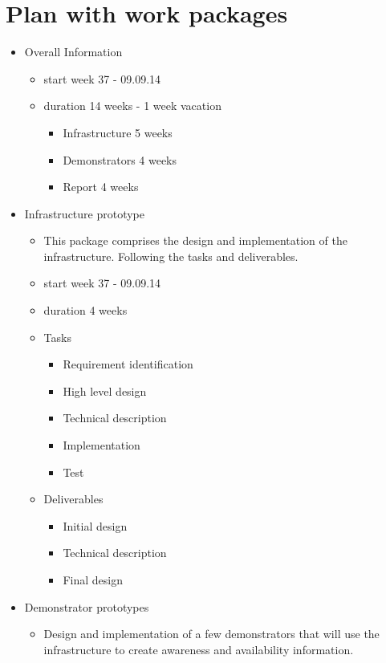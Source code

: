 \documentclass{sigchi}
\begin{document}
\section{Plan with work packages}

\begin{itemize}
\item Overall Information
    \begin{itemize}    
    \item start week 37 - 09.09.14
    \item duration 14 weeks - 1 week vacation
        \begin{itemize}
        \item Infrastructure 5 weeks
        \item Demonstrators 4 weeks
        \item Report 4 weeks
        \end{itemize}
    \end{itemize}
\item Infrastructure prototype
    \begin{itemize}
    \item This package comprises the design and implementation of the infrastructure. Following the tasks and deliverables.
    \item start week 37 - 09.09.14
    \item duration 4 weeks
    \item Tasks
        \begin{itemize}
        \item Requirement identification
        \item High level design
        \item Technical description
        \item Implementation
        \item Test
        \end{itemize}
    \item Deliverables
        \begin{itemize}
        \item Initial design
        \item Technical description
        \item Final design
        \end{itemize}
    \end{itemize}
\item Demonstrator prototypes
    \begin{itemize}
    \item Design and implementation of a few demonstrators that will use the infrastructure to create awareness and availability information.

\end{itemize}
\end{itemize}
\end{document}
